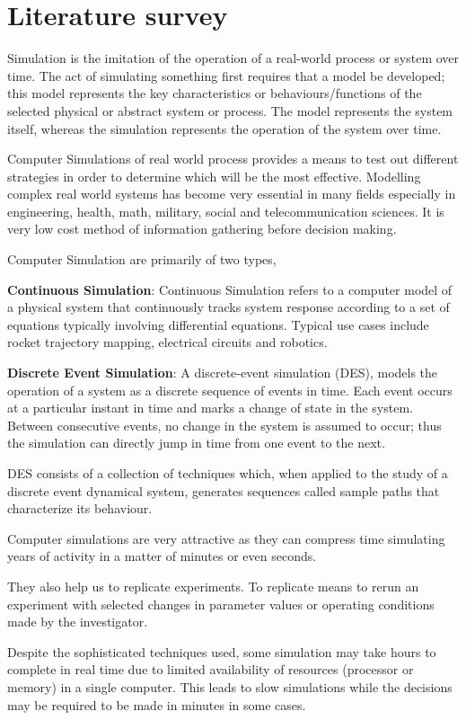 \documentclass[12pt,a4paper]{article}
\begin{document}
\section{Literature survey}
Simulation is the imitation of the operation of a real-world process or system over time. The act of simulating something first requires that a model be developed; this model represents the key characteristics or behaviours/functions of the selected physical or abstract system or process. The model represents the system itself, whereas the simulation represents the operation of the system over time.

	Computer Simulations of real world process provides a means to test out different strategies in order to determine which will be the most effective. Modelling complex real world systems has become very essential in many fields especially in engineering, health, math, military, social and telecommunication sciences. It is very low cost method of information gathering before decision making. 
	
	Computer Simulation are primarily of two types,
	
	\textbf{Continuous Simulation}: Continuous Simulation refers to a computer model of a physical system that continuously tracks system response according to a set of equations typically involving differential equations.	Typical use cases include rocket trajectory mapping, electrical circuits and robotics.
	
	\textbf{Discrete Event Simulation}: A discrete-event simulation (DES), models the operation of a system as a discrete sequence of events in time. Each event occurs at a particular instant in time and marks a change of state in the system. Between consecutive events, no change in the system is assumed to occur; thus the simulation can directly jump in time from one event to the next.
	
	DES consists of a collection of techniques which, when applied to the study of a discrete event dynamical system, generates sequences called sample paths that characterize its behaviour.
		
	Computer simulations are very attractive as they can compress time simulating years of activity in a matter of minutes or even seconds.
	
	They also help us to replicate experiments. To replicate means to rerun an experiment with selected changes in parameter values or operating conditions made by the investigator. 
	
	Despite the sophisticated techniques used, some simulation may take hours to complete in real time due to limited availability of resources (processor or memory) in a single computer. This leads to slow simulations while the decisions may be required to be made in minutes in some cases.
	
\end{document}
